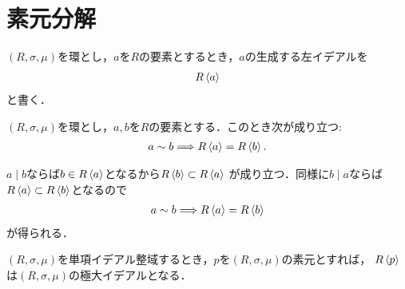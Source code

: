 \section{素元分解}
	$(R,\sigma,\mu)$を環とし，$a$を$R$の要素とするとき，$a$の生成する左イデアルを
	\begin{align}
		R\inprod<a>
	\end{align}
	と書く．
	
	\begin{screen}
		\begin{thm}[同伴な要素が生成するイデアルは等しい]
		\label{thm:associate_elements_principle_ideals_are_equivalent}
			$(R,\sigma,\mu)$を環とし，$a,b$を$R$の要素とする．このとき次が成り立つ:
			\begin{align}
				a \sim b \Longrightarrow R\inprod<a> = R\inprod<b>.
			\end{align}
		\end{thm}
	\end{screen}
	
	\begin{prf}
		$a \mid b$ならば$b \in R\inprod<a>$となるから$R\inprod<b> \subset R\inprod<a>$
		が成り立つ．同様に$b \mid a$ならば$R\inprod<a> \subset R\inprod<b>$となるので
		\begin{align}
			a \sim b \Longrightarrow R\inprod<a> = R\inprod<b>
		\end{align}
		が得られる．
		\QED
	\end{prf}
	
	\begin{screen}
		\begin{thm}[単項イデアル整域において素元が生成するイデアルは極大イデアルである]
		\label{thm:principal_ideal_domain_maximum_ideal}
			$(R,\sigma,\mu)$を単項イデアル整域するとき，$p$を$(R,\sigma,\mu)$の素元とすれば，
			$R\inprod<p>$は$(R,\sigma,\mu)$の極大イデアルとなる．
		\end{thm}
	\end{screen}
	
